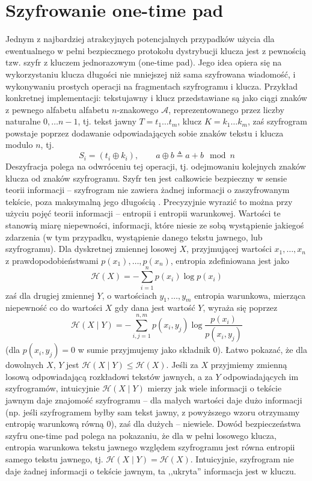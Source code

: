 \documentclass[10pt]{article}
\begin{document}


\section{Szyfrowanie one-time pad}
\label{one-time-pad}

Jednym z najbardziej atrakcyjnych potencjalnych przypadków użycia dla ewentualnego w pełni bezpiecznego
protokołu dystrybucji klucza jest z pewnością tzw. szyfr z kluczem jednorazowym (one-time pad). Jego
idea opiera się na wykorzystaniu klucza długości nie mniejszej niż sama szyfrowana wiadomość, i
wykonywaniu prostych operacji na fragmentach szyfrogramu i klucza. Przykład konkretnej implementacji:
tekstujawny i klucz przedstawiane są jako ciągi znaków z pewnego alfabetu alfabetu \(n\)-znakowego 
\(\mathcal{A}\), reprezentowanego przez liczby naturalne \(0,\ldots n-1\), tj. tekst jawny 
\(T=t_1\ldots t_m\), klucz \(K=k_1\ldots k_m\), zaś szyfrogram powstaje poprzez dodawanie odpowiadających
sobie znaków tekstu i klucza modulo \(n\), tj.
\[
S_i=\left(t_i\oplus k_i\right),\qquad a\oplus b \triangleq a+b \mod n
\]
Deszyfracja polega na odwróceniu tej operacji, tj. odejmowaniu kolejnych znaków klucza od znaków
szyfrogramu. Szyfr ten jest całkowicie bezpieczny w sensie teorii informacji -- szyfrogram nie zawiera
żadnej informacji o zaszyfrowanym tekście, poza maksymalną jego długością \cite{Shannon49}. Precyzyjnie
wyrazić to można przy użyciu pojęć teorii informacji -- entropii i entropii warunkowej. Wartości te 
stanowią miarę niepewności, informacji, które niesie ze sobą wystąpienie jakiegoś zdarzenia (w tym
przypadku, wystąpienie danego tekstu jawnego, lub szyfrogramu).
Dla dyskretnej zmiennej losowej \(X\), przyjmującej wartości \(x_1,\ldots,x_n\) z prawdopodobieństwami
\(p(x_1),\ldots,p(x_n)\), entropia zdefiniowana jest jako
\[
\mathcal{H}(X)=-\sum_{i=1}^n p(x_i)\log p(x_i)
\]
zaś dla drugiej zmiennej \(Y\), o wartościach \(y_1,\ldots,y_m\) entropia warunkowa, mierząca niepewność
co do wartości \(X\) gdy dana jest wartość \(Y\), wyraża się poprzez
\[
\mathcal{H}(X\mid Y)=-\sum_{i,j=1}^{n,m}p(x_i,y_j)\log \frac{p(x_i)}{p(x_i,y_j)}
\]
(dla \(p(x_i,y_j)=0\) w sumie przyjmujemy jako składnik \(0\)). Łatwo pokazać, że dla dowolnych \(X\),
\(Y\) jest \(\mathcal{H}(X\mid Y)\leq \mathcal{H}(X)\). Jeśli za \(X\) przyjmiemy zmienną losową
odpowiadającą rozkładowi tekstów jawnych, a za \(Y\) odpowiadających im szyfrogramów, intuicyjnie
\(\mathcal{H}(X\mid Y)\) mierzy jak wiele informacji o tekście jawnym daje znajomość szyfrogramu --
dla małych wartości daje dużo informacji (np. jeśli szyfrogramem byłby sam tekst jawny, z powyższego
wzoru otrzymamy entropię warunkową równą \(0\)), zaś dla dużych -- niewiele. Dowód bezpieczeństwa szyfru
one-time pad polega na pokazaniu, że dla w pełni losowego klucza, entropia warunkowa tekstu jawnego
względem szyfrogramu jest równa entropii samego tekstu jawnego, tj. 
\(\mathcal{H}(X\mid Y) = \mathcal{H}(X)\). Intuicyjnie, szyfrogram nie daje żadnej informacji o tekście
jawnym, ta ,,ukryta'' informacja jest w kluczu.
\end{document}
